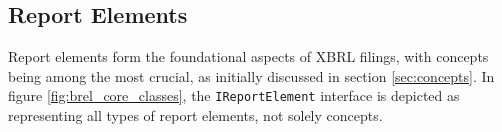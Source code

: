 




\subsection{Report Elements}

Report elements form the foundational aspects of XBRL filings, with concepts being among the most crucial, as initially discussed in section \ref{sec:concepts}.
In figure \ref{fig:brel_core_classes}, the \texttt{IReportElement} interface is depicted as representing all types of report elements, not solely concepts.

